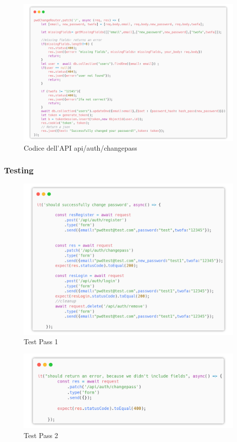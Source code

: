 \documentclass{report}
\begin{document}
\begin{figure}[H]
	\centering\includegraphics[width=1\textwidth]{images/microservizio-autenticazione/changepass-carbon.png}
	Codice dell'API api/auth/changepass
\end{figure}


\subsubsection*{Testing}
\begin{figure}[H]
	\centering\includegraphics[width=1\textwidth]{images/microservizio-autenticazione/tests/password_test_1.png}
	\caption{Test Pass 1}
\end{figure}
\begin{figure}[H]
	\centering\includegraphics[width=1\textwidth]{images/microservizio-autenticazione/tests/password_test_2.png}
	\caption{Test Pass 2}
\end{figure}
\end{document}
